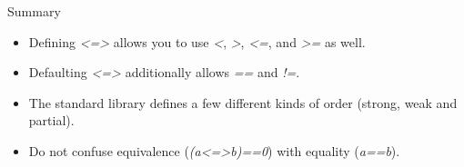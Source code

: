 \begin{frame}[fragile]
    \begin{block}{Summary}
      \begin{itemize}
        \item Defining {\it <=>} allows you to use {\it <}, {\it >}, {\it <=}, and {\it >=} as well.
        \item Defaulting {\it <=>} additionally allows {\it ==} and  {\it !=}.
        \item The standard library defines a few different kinds of order (strong, weak and partial).
        \item Do not confuse equivalence ({\it (a<=>b)==0}) with equality ({\it a==b}).      \end{itemize}
    \end{block}
\end{frame}
